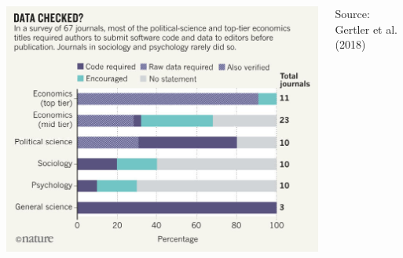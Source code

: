 \documentclass[aspectratio=169]{beamer}
\begin{document}
 { %
\usebackgroundtemplate{}
	
    \begin{frame}[plain]
     \end{frame}
 }

\usebackgroundtemplate{}
\begin{frame}
\begin{columns}
\begin{column}{0.75\textwidth}
 \href{https://www.nature.com/articles/d41586-018-02108-9}{ \includegraphics[height=\paperheight]{../Images/Gertler_Nature1.jpg}}
\end{column}
\begin{column}{0.17\textwidth}
Source: Gertler et al. (2018)
\end{column}
\end{columns}
\end{frame}
\end{document}
